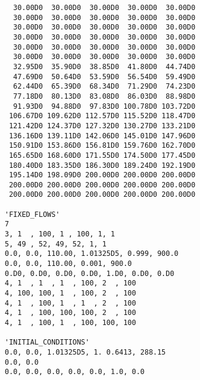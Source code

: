 \begin{verbatim}
  30.00D0  30.00D0  30.00D0  30.00D0  30.00D0
  30.00D0  30.00D0  30.00D0  30.00D0  30.00D0
  30.00D0  30.00D0  30.00D0  30.00D0  30.00D0
  30.00D0  30.00D0  30.00D0  30.00D0  30.00D0
  30.00D0  30.00D0  30.00D0  30.00D0  30.00D0
  30.00D0  30.00D0  30.00D0  30.00D0  30.00D0
  32.95D0  35.90D0  38.85D0  41.80D0  44.74D0
  47.69D0  50.64D0  53.59D0  56.54D0  59.49D0
  62.44D0  65.39D0  68.34D0  71.29D0  74.23D0
  77.18D0  80.13D0  83.08D0  86.03D0  88.98D0
  91.93D0  94.88D0  97.83D0 100.78D0 103.72D0 
 106.67D0 109.62D0 112.57D0 115.52D0 118.47D0
 121.42D0 124.37D0 127.32D0 130.27D0 133.21D0 
 136.16D0 139.11D0 142.06D0 145.01D0 147.96D0
 150.91D0 153.86D0 156.81D0 159.76D0 162.70D0 
 165.65D0 168.60D0 171.55D0 174.50D0 177.45D0
 180.40D0 183.35D0 186.30D0 189.24D0 192.19D0 
 195.14D0 198.09D0 200.00D0 200.00D0 200.00D0
 200.00D0 200.00D0 200.00D0 200.00D0 200.00D0 
 200.00D0 200.00D0 200.00D0 200.00D0 200.00D0

'FIXED_FLOWS'
7
3, 1  , 100, 1 , 100, 1, 1
5, 49 , 52, 49, 52, 1, 1
0.0, 0.0, 110.00, 1.01325D5, 0.999, 900.0
0.0, 0.0, 110.00, 0.001, 900.0
0.D0, 0.D0, 0.D0, 0.D0, 1.D0, 0.D0, 0.D0
4, 1  , 1  , 1  , 100, 2  , 100
4, 100, 100, 1  , 100, 2  , 100
4, 1  , 100, 1  , 1  , 2  , 100
4, 1  , 100, 100, 100, 2  , 100
4, 1  , 100, 1  , 100, 100, 100

'INITIAL_CONDITIONS'
0.0, 0.0, 1.01325D5, 1. 0.6413, 288.15 
0.0, 0.0
0.0, 0.0, 0.0, 0.0, 0.0, 1.0, 0.0

\end{verbatim}
